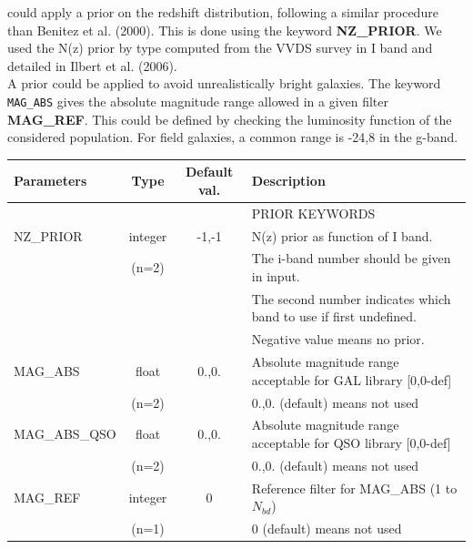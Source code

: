 \documentclass[12pt]{article}
\begin{document}
\lp could apply a prior on the redshift distribution, following a similar procedure than  Benitez et al. (2000). This is done using the keyword {\bf NZ\_PRIOR}. We used the N(z) prior by type computed from the VVDS survey in I band  and detailed in Ilbert et al. (2006).\\

A prior could be applied to avoid unrealistically bright galaxies. The keyword \texttt{MAG\_ABS} gives the absolute magnitude range allowed in a given filter {\bf MAG\_REF}. This could be defined by checking the luminosity function of the considered population. For field galaxies, a common range is -24,8 in the g-band.\\



\begin{tabular}{lccl}
\\[0.5cm]
\textbf{Parameters}     & \textbf{Type}    & \textbf{Default val.} &  \textbf{Description}                                             \\[5pt]
\hline
                             &           &          &   PRIOR  KEYWORDS    \\
\hline
%
NZ\_PRIOR    & integer & -1,-1  &   N(z) prior as function of I band. \\ 
             & (n=2)   &     &   The i-band number should be given in input. \\
             &         &     &   The second number indicates which band to use if first undefined.    \\
             &         &     &   Negative value means no prior.   \\
%
MAG\_ABS      & float   &  0.,0.  &  Absolute magnitude range acceptable for GAL library [0,0-def]\\
                        & (n=2)   &         &  0.,0. (default) means  not used                          \\
MAG\_ABS\_QSO  & float   & 0.,0.   &  Absolute magnitude range acceptable for QSO library [0,0-def]\\
                        & (n=2)   &         &  0.,0. (default) means  not used                          \\
%
MAG\_REF      & integer &  0      &  Reference filter for MAG\_ABS   (1 to $N_{bd}$)               \\
                        & (n=1)   &         &  0 (default) means  not used                              \\
\hline
\end{tabular}
\end{document}

